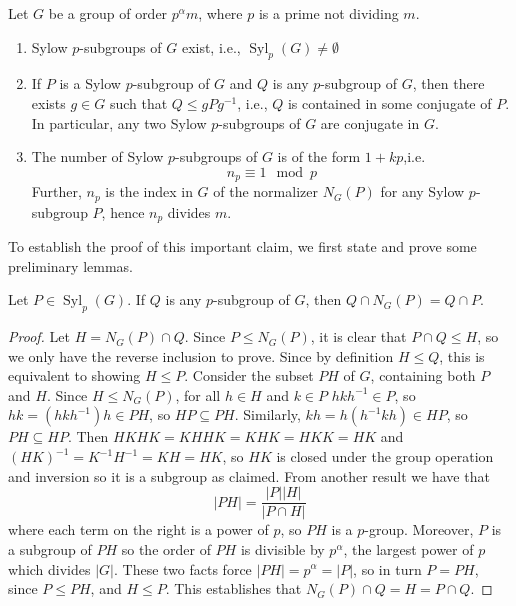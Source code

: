 \documentclass[12pt, a4paper, oneside, openright, titlepage]{book}
\begin{document}
\begin{namthm}\label{thmname:syl}
    Let $G$ be a group of order $p^{\alpha}m$, where $p$ is a prime not dividing $m$.\begin{enumerate}
        \item Sylow $p$-subgroups of $G$ exist, i.e., $\operatorname{Syl}_p(G) \neq \emptyset$
        \item If $P$ is a Sylow $p$-subgroup of $G$ and $Q$ is any $p$-subgroup of $G$, then there exists $g \in G$ such that $Q\leq gPg^{-1}$, i.e., $Q$ is contained in some conjugate of $P$. In particular, any two Sylow $p$-subgroups of $G$ are conjugate in $G$.
        \item The number of Sylow $p$-subgroups of $G$ is of the form $1+kp$,i.e. \begin{equation*}
                n_p \equiv 1\mod p
        \end{equation*}
            Further, $n_p$ is the index in $G$ of the normalizer $N_G(P)$ for any Sylow $p$-subgroup $P$, hence $n_p$ divides $m$.
    \end{enumerate}
\end{namthm}

To establish the proof of this important claim, we first state and prove some preliminary lemmas.

\begin{lem}
    Let $P\in \operatorname{Syl}_p(G)$. If $Q$ is any $p$-subgroup of $G$, then $Q\cap N_G(P) = Q\cap P$.
\end{lem}
\begin{proof}
    Let $H = N_G(P) \cap Q$. Since $P \leq N_G(P)$, it is clear that $P\cap Q \leq H$, so we only have the reverse inclusion to prove. Since by definition $H \leq Q$, this is equivalent to showing $H \leq P$. Consider the subset $PH$ of $G$, containing both $P$ and $H$. Since $H \leq N_G(P)$, for all $h \in H$ and $k \in P$ $hkh^{-1} \in P$, so $hk = (hkh^{-1})h \in PH$, so $HP \subseteq PH$. Similarly, $kh = h(h^{-1}kh) \in HP$, so $PH \subseteq HP$. Then $HKHK = KHHK = KHK = HKK= HK$ and $(HK)^{-1} = K^{-1}H^{-1} = KH = HK$, so $HK$ is closed under the group operation and inversion so it is a subgroup as claimed. From another result we have that \begin{equation*}
        |PH| = \frac{|P||H|}{|P\cap H|}
    \end{equation*}
    where each term on the right is a power of $p$, so $PH$ is a $p$-group. Moreover, $P$ is a subgroup of $PH$ so the order of $PH$ is divisible by $p^{\alpha}$, the largest power of $p$ which divides $|G|$. These two facts force $|PH| = p^{\alpha} = |P|$, so in turn $P = PH$, since $P \leq PH$, and $H \leq P$. This establishes that $N_G(P)\cap Q = H = P\cap Q$.
\end{proof}
\end{document}
